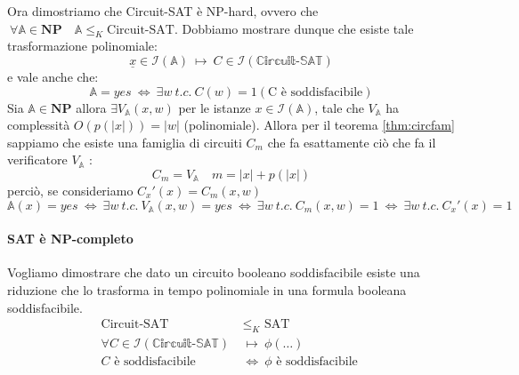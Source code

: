 \documentclass[a4paper]{article}
\theoremstyle{definition}
\newcommand{\np}{\mathbf{NP}}
\newcommand{\prob}[1]{\mathbb{#1}}
\newcommand{\instance}[1]{\mathcal{I}(\prob{#1})}
\begin{document}
		Ora dimostriamo che Circuit-SAT è NP-hard, ovvero che $ \ \forall \prob{A} \in \np \quad \prob{A} \leq_K \text{Circuit-SAT} $. Dobbiamo mostrare dunque che esiste tale trasformazione polinomiale:
		\[
			\underline{x} \in \instance{A} \ \longmapsto \ C\in \instance{\text{Circuit-SAT}}
		\]
		e vale anche che:
		\[
			\prob{A} = yes \ \Leftrightarrow \ \exists w \ t.c. \ C(w) = 1 (\text{C è soddisfacibile})
		\]
		Sia $ \prob{A} \in \np $ allora $ \exists V_{\prob{A}}(x, w) $ per le istanze $ x \in \instance{A} $, tale che $ V_{\prob{A}} $ ha complessità $ O(p(\vert x\vert)) = \vert w \vert $ (polinomiale). Allora per il teorema \ref{thm:circfam} sappiamo che esiste una famiglia di circuiti $ C_m $ che fa esattamente ciò che fa il verificatore $ V_{\prob{A}} $ :
		\[
			C_m = V_{\prob{A}} \quad m = \vert x \vert + p(\vert x\vert)
		\]
		perciò, se consideriamo $ C_x'(x) = C_m(x, w) $
		\[
			\prob{A}(x) = yes \ \Leftrightarrow \ \exists w\ t.c. \ V_{\prob{A}}(x, w) = yes \ \Leftrightarrow \ \exists w\ t.c. \ C_m(x, w) = 1 \ \Leftrightarrow \ \exists w\ t.c. \ C_x'(x) = 1 
		\]
		
		\paragraph{SAT è NP-completo} Vogliamo dimostrare che dato un circuito booleano soddisfacibile esiste una riduzione che lo trasforma in tempo polinomiale in una formula booleana soddisfacibile.
		\begin{align*}
			 \text{Circuit-SAT } &\leq_K \text{ SAT} \\
			\forall C \in \instance{\text{Circuit-SAT}} \ &\longmapsto \ \phi(\dots)\\
			C \text{ è soddisfacibile } &\Leftrightarrow \ \phi \text{ è soddisfacibile }
		\end{align*}
		
\end{document}
